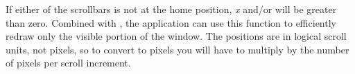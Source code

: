 

If either of the scrollbars is not at the home position, {\it x} and/or
 will be greater than zero.  Combined with ,
the application can use this function to efficiently redraw only the
visible portion of the window.  The positions are in logical scroll
units, not pixels, so to convert to pixels you will have to multiply
by the number of pixels per scroll increment.





